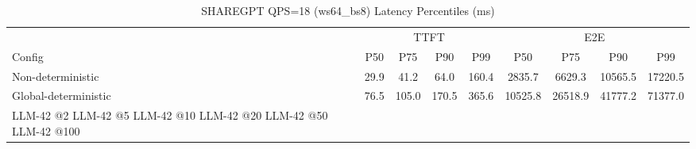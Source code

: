 \begin{table}[htbp]
\centering
\caption{SHAREGPT QPS=18 (ws64_bs8) Latency Percentiles (ms)}
\label{tab:sharegpt_qps18_ws64_bs8}
\begin{tabular}{l|cccc|cccc}
\toprule
& \multicolumn{4}{c|}{TTFT} & \multicolumn{4}{c}{E2E} \\
Config & P50 & P75 & P90 & P99 & P50 & P75 & P90 & P99 \\
\midrule
Non-deterministic & 29.9 & 41.2 & 64.0 & 160.4 & 2835.7 & 6629.3 & 10565.5 & 17220.5 \\
Global-deterministic & 76.5 & 105.0 & 170.5 & 365.6 & 10525.8 & 26518.9 & 41777.2 & 71377.0 \\
LLM-42 @2%
LLM-42 @5%
LLM-42 @10%
LLM-42 @20%
LLM-42 @50%
LLM-42 @100%
\bottomrule
\end{tabular}
\end{table}
